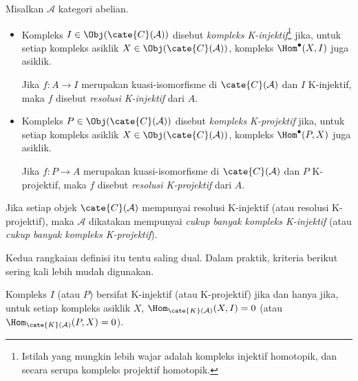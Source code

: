 \begin{definisi}[N.\ Spaltenstein]\label{def:K-resolutions}
	Misalkan $\mathcal{A}$ kategori abelian.
	\begin{itemize}
		\item Kompleks $I \in \Obj(\cate{C}(\mathcal{A}))$ disebut
		\emph{kompleks K-injektif}\footnote{Istilah yang mungkin lebih wajar
		adalah kompleks injektif homotopik, dan secara serupa kompleks
		projektif homotopik.} jika, untuk setiap kompleks asiklik
		$X \in \Obj(\cate{C}(\mathcal{A}))$, kompleks
		$\Hom^\bullet(X,I)$ juga asiklik.

		Jika $f:A\to I$ merupakan kuasi-isomorfisme di
		$\cate{C}(\mathcal{A})$ dan $I$ K-injektif, maka $f$ disebut
		\emph{resolusi K-injektif} dari $A$.
		\item Kompleks $P \in \Obj(\cate{C}(\mathcal{A}))$ disebut
		\emph{kompleks K-projektif} jika, untuk setiap kompleks asiklik
		$X \in \Obj(\cate{C}(\mathcal{A}))$, kompleks
		$\Hom^\bullet(P,X)$ juga asiklik.

		Jika $f:P\to A$ merupakan kuasi-isomorfisme di
		$\cate{C}(\mathcal{A})$ dan $P$ K-projektif, maka $f$ disebut
		\emph{resolusi K-projektif} dari $A$.
	\end{itemize}

	Jika setiap objek $\cate{C}(\mathcal{A})$ mempunyai resolusi K-injektif
	(atau resolusi K-projektif), maka $\mathcal{A}$ dikatakan mempunyai
	\emph{cukup banyak kompleks K-injektif} (atau
	\emph{cukup banyak kompleks K-projektif}).
\end{definisi}

Kedua rangkaian definisi itu tentu saling dual. Dalam praktik, kriteria
berikut sering kali lebih mudah digunakan.

\begin{lema}\label{prop:K-injective-criterion}
	Kompleks $I$ (atau $P$) bersifat K-injektif (atau K-projektif) jika dan
	hanya jika, untuk setiap kompleks asiklik $X$,
	$\Hom_{\cate{K}(\mathcal{A})}(X,I)=0$ (atau
	$\Hom_{\cate{K}(\mathcal{A})}(P,X)=0$).
\end{lema}

